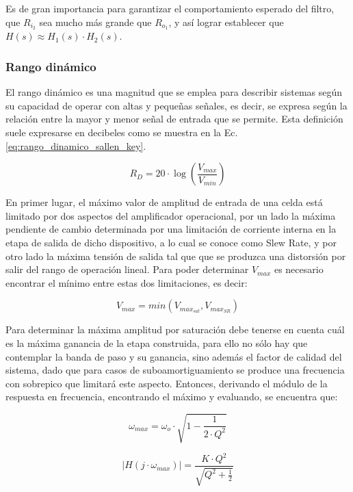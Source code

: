 Es de gran importancia para garantizar el comportamiento esperado del filtro, que $R_{i_2}$ sea mucho m\'as grande que $R_{o_1}$, y as\'i
lograr establecer que $H(s) \approx H_1(s) \cdot H_2(s)$.

\subsubsection{Rango din\'amico}
El rango din\'amico es una magnitud que se emplea para describir sistemas seg\'un su capacidad de operar con altas y peque\~nas se\~nales, es decir,
se expresa seg\'un la relaci\'on entre la mayor y menor se\~nal de entrada que se permite. Esta definici\'on suele expresarse en decibeles como se muestra en la
Ec. \ref{eq:rango_dinamico_sallen_key}.

\begin{equation}
    R_D = 20 \cdot \log(\frac{V_{max}}{V_{min}})
    \label{eq:rango_dinamico_sallen_key}
\end{equation}

En primer lugar, el m\'aximo valor de amplitud de entrada de una celda est\'a limitado por dos aspectos del amplificador operacional,
por un lado la m\'axima pendiente de cambio determinada por una limitaci\'on de corriente interna en la etapa de salida de dicho dispositivo,
a lo cual se conoce como Slew Rate, y por otro lado la m\'axima tensi\'on de salida tal que que se produzca una distorsi\'on por salir del rango de operaci\'on lineal.
Para poder determinar $V_{max}$ es necesario encontrar el m\'inimo entre estas dos limitaciones, es decir:

\begin{equation}
    V_{max} = min(V_{max_{sat}},V_{max_{SR}})
\end{equation}

Para determinar la m\'axima amplitud por saturaci\'on debe tenerse en cuenta cu\'al es la m\'axima ganancia de la etapa construida,
para ello no s\'olo hay que contemplar la banda de paso y su ganancia, sino adem\'as el factor de calidad del sistema, dado que para casos
de suboamortiguamiento se produce una frecuencia con sobrepico que limitar\'a este aspecto. Entonces, derivando el m\'odulo de la respuesta en frecuencia,
encontrando el m\'aximo y evaluando, se encuentra que:

\begin{equation}
    \omega_{max} = \omega_o \cdot \sqrt{1 - \frac{1}{2 \cdot Q^{2}}}
\end{equation}

\begin{equation}
    |H(j \cdot \omega_{max})| = \frac{K \cdot Q^{2}}{ \sqrt{Q^{2} + \frac{1}{2}}}
\end{equation}

